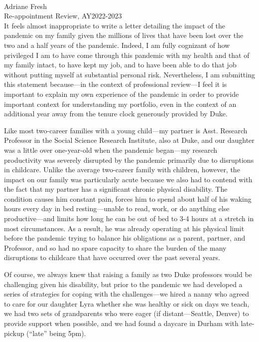 \documentclass[11pt]{article}
\begin{document}
\singlespacing
\setlength{\parindent}{0in}
\setlength{\parskip}{.15in}







\noindent \large{\textbf{}} \\ \normalsize
\noindent Adriane Fresh \\
\noindent Re-appointment Review, AY2022-2023  \\

It feels almost inappropriate to write a letter detailing the impact of the pandemic on my family given the millions of lives that have been lost over the two and a half years of the pandemic. Indeed, I am fully cognizant of how privileged I am to have come through this pandemic with my health and that of my family intact, to have kept my job, and to have been able to do that job without putting myself at substantial personal risk.  Nevertheless, I am submitting this statement because---in the context of professional review---I feel it is important to explain my own experience of the pandemic in order to provide important context for understanding my portfolio, even in the context of an additional year away from the tenure clock generously provided by Duke.

Like most two-career families with a young child---my partner is Asst. Research Professor in the Social Science Research Institute, also at Duke, and our daughter was a little over one-year-old when the pandemic began---my research productivity was severely disrupted by the pandemic primarily due to disruptions in childcare. Unlike the average two-career family with children, however, the impact on our family was particularly acute because we also had to contend with the fact that my partner has a significant chronic physical disability. The condition causes him constant pain, forces him to spend about half of his waking hours every day in bed resting---unable to read, work, or do anything else productive---and limits how long he can be out of bed to 3-4 hours at a stretch in most circumstances. As a result, he was already operating at his physical limit before the pandemic trying to balance his obligations as a parent, partner, and Professor, and so had no spare capacity to share the burden of the many disruptions to childcare that have occurred over the past several years.

Of course, we always knew that raising a family as two Duke professors would be challenging given his disability, but prior to the pandemic we had developed a series of strategies for coping with the challenges---we hired a nanny who agreed to care for our daughter Lyra whether she was healthy or sick on days we teach, we had two sets of grandparents who were eager (if distant---Seattle, Denver) to provide support when possible, and we had found a daycare in Durham with late-pickup (``late'' being 5pm).
\end{document}
